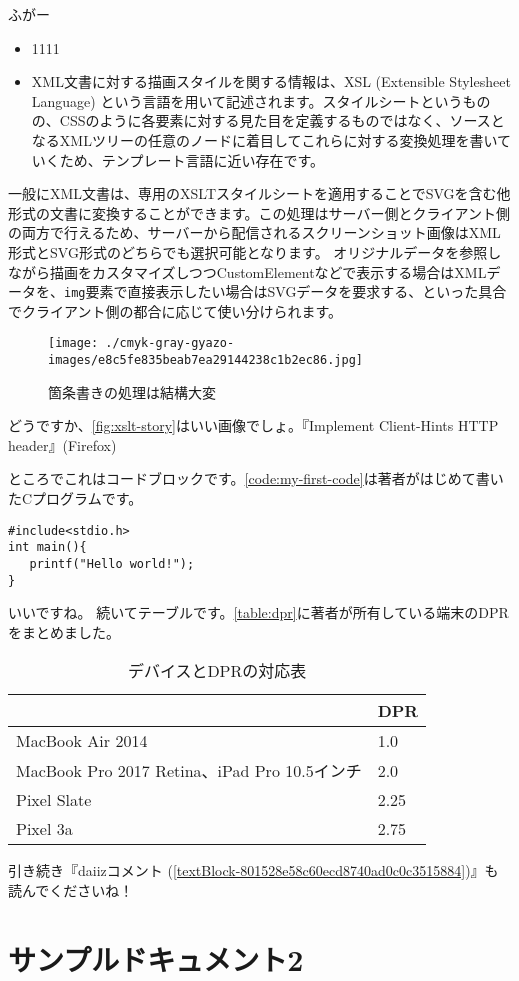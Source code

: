 ふがー
\begin{itemize}
  \item 1111
  \item XML文書に対する描画スタイルを関する情報は、XSL (Extensible Stylesheet Language) という言語を用いて記述されます。スタイルシートというものの、CSSのように各要素に対する見た目を定義するものではなく、ソースとなるXMLツリーの任意のノードに着目してこれらに対する変換処理を書いていくため、テンプレート言語に近い存在です。
\end{itemize}

一般にXML文書は、専用のXSLTスタイルシートを適用することでSVGを含む他形式の文書に変換することができます。この処理はサーバー側とクライアント側の両方で行えるため、サーバーから配信されるスクリーンショット画像はXML形式とSVG形式のどちらでも選択可能となります。
オリジナルデータを参照しながら描画をカスタマイズしつつCustomElementなどで表示する場合はXMLデータを、{\tt img}要素で直接表示したい場合はSVGデータを要求する、といった具合でクライアント側の都合に応じて使い分けられます。\\

\begin{figure}[h]
  \begin{center}
     \texttt{[image: ./cmyk-gray-gyazo-images/e8c5fe835beab7ea29144238c1b2ec86.jpg]}
     \caption{箇条書きの処理は結構大変}
     \label{fig:xslt-story}
  \end{center}
\end{figure}

どうですか、\autoref{fig:xslt-story}はいい画像でしょ。『Implement Client-Hints HTTP header』(Firefox)\par
ところでこれはコードブロックです。\autoref{code:my-first-code}は著者がはじめて書いたCプログラムです。
\begin{lstlisting}[frame=tb,label=code:my-first-code,caption=my\_first\_code.c]
#include<stdio.h>
int main(){
   printf("Hello world!");
}
\end{lstlisting}

いいですね。
続いてテーブルです。\autoref{table:dpr}に著者が所有している端末のDPRをまとめました。
\begin{table}[htb]
\begin{center}
  \caption{デバイスとDPRの対応表}
  \label{table:dpr}
  \begin{tabular}{|l|l|} \hline
     & DPR \\ \hline
    MacBook Air 2014 & 1.0 \\
    MacBook Pro 2017 Retina、iPad Pro 10.5インチ & 2.0 \\
    Pixel Slate & 2.25 \\
    Pixel 3a & 2.75 \\ \hline
  \end{tabular}
\end{center}
\end{table}

引き続き『daiizコメント {\scriptsize (\autoref{textBlock-801528e58c60ecd8740ad0c0c3515884})}』も読んでくださいね！\\

\chapter{サンプルドキュメント2}
\label{textBlock-801528e58c60ecd8740ad0c0c3515884}


